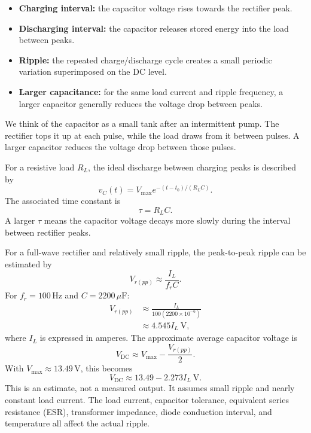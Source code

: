 \documentclass[journal,12pt,twocolumn]{IEEEtran}
\begin{document}
\begin{itemize}[leftmargin=1.5em]
    \item \textbf{Charging interval:} the capacitor voltage rises
    towards the rectifier peak.
    \item \textbf{Discharging interval:} the capacitor releases stored
    energy into the load between peaks.
    \item \textbf{Ripple:} the repeated charge/discharge cycle creates
    a small periodic variation superimposed on the DC level.
    \item \textbf{Larger capacitance:} for the same load current and
    ripple frequency, a larger capacitor generally reduces the
    voltage drop between peaks.
\end{itemize}

We think of the capacitor as a small tank after an intermittent pump.
The rectifier tops it up at each pulse, while the load draws from it
between pulses. A larger capacitor reduces the voltage drop between
those pulses.

For a resistive load $R_L$, the ideal discharge between charging
peaks is described by
\begin{equation}
    \boxed{v_C(t)=V_{\max}
    e^{-(t-t_0)/(R_LC)}.}
    \label{eq:cap-discharge}
\end{equation}
The associated time constant is
\begin{equation}
    \boxed{\tau=R_LC.}
    \label{eq:rc-time}
\end{equation}
A larger $\tau$ means the capacitor voltage decays more slowly
during the interval between rectifier peaks.

For a full-wave rectifier and relatively small ripple, the
peak-to-peak ripple can be estimated by
\begin{equation}
    \boxed{V_{r(pp)}\approx\frac{I_L}{f_rC}.}
    \label{eq:ripple-estimate}
\end{equation}
For $f_r=100\,\mathrm{Hz}$ and $C=2200\,\mu\mathrm{F}$:
\begin{align}
    V_{r(pp)}
    &\approx \frac{I_L}{100(2200\times10^{-6})}\\
    &\approx 4.545 I_L\ \mathrm{V},
\end{align}
where $I_L$ is expressed in amperes. The approximate average
capacitor voltage is
\begin{equation}
    \boxed{V_{\mathrm{DC}}\approx
    V_{\max}-\frac{V_{r(pp)}}{2}.}
    \label{eq:cap-average}
\end{equation}
With $V_{\max}\approx13.49\,\mathrm{V}$, this becomes
\begin{equation}
    V_{\mathrm{DC}}\approx13.49-2.273I_L\ \mathrm{V}.
\end{equation}
This is an estimate, not a measured output. It assumes small ripple
and nearly constant load current. The load current, capacitor
tolerance, equivalent series resistance (ESR), transformer
impedance, diode conduction interval, and temperature all affect
the actual ripple.
\end{document}
